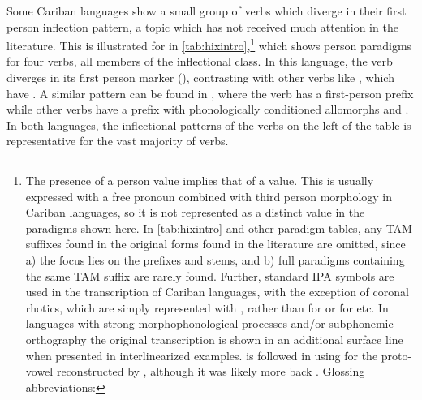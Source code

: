 Some Cariban languages show a small group of verbs which diverge in their first person inflection pattern, a topic which has not received much attention in the literature.
This is illustrated for \hixka in \cref{tab:hixintro},\footnote{The presence of a  person value implies that of a  value.
This is usually expressed with a free pronoun combined with third person morphology in Cariban languages, so it is not represented as a distinct value in the paradigms shown here.
In \cref{tab:hixintro} and other paradigm tables, any TAM suffixes found in the original forms found in the literature are omitted, since a) the focus lies on the prefixes and stems, and b) full paradigms containing the same TAM suffix are rarely found.
Further, standard IPA symbols are used in the transcription of Cariban languages, with the exception of coronal rhotics, which are simply represented with , rather than  for \wayana or  for \maqui etc.
In languages with strong morphophonological processes and/or subphonemic orthography the original transcription is shown in an additional surface line when presented in interlinearized examples.
\textcite{gildea2018reconstructing} is followed in using  for the proto-vowel reconstructed by \textcite{meira2005southern}, although it was likely more back \parencite{gildea2010story}.
Glossing abbreviations: }%
which shows person paradigms for four verbs, all members of the  inflectional class.
In this language, the verb  diverges in its first person marker (), contrasting with other  verbs like , which have .
A similar pattern can be found in \trio, where the verb  has a first-person prefix  while other  verbs have a prefix with phonologically conditioned allomorphs  and  .
In both languages, the inflectional patterns of the verbs on the left of the table is representative for the vast majority of  verbs.

